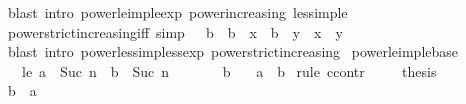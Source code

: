 \begin{isabellebody}
\ {\isacharparenleft}{\kern0pt}blast\ intro{\isacharcolon}{\kern0pt}\ power{\isacharunderscore}{\kern0pt}le{\isacharunderscore}{\kern0pt}imp{\isacharunderscore}{\kern0pt}le{\isacharunderscore}{\kern0pt}exp\ power{\isacharunderscore}{\kern0pt}increasing\ less{\isacharunderscore}{\kern0pt}imp{\isacharunderscore}{\kern0pt}le{\isacharparenright}{\kern0pt}%
\endisatagproof
{\isafoldproof}%
%
\isadelimproof
\isanewline
%
\endisadelimproof
\isanewline
{}\isamarkupfalse%
\ power{\isacharunderscore}{\kern0pt}strict{\isacharunderscore}{\kern0pt}increasing{\isacharunderscore}{\kern0pt}iff\ {\isacharbrackleft}{\kern0pt}simp{\isacharbrackright}{\kern0pt}{\isacharcolon}{\kern0pt}\ {\isachardoublequoteopen}{}\ {\isacharless}{\kern0pt}\ b\ {\isasymLongrightarrow}\ b\ {\isacharcircum}{\kern0pt}\ x\ {\isacharless}{\kern0pt}\ b\ {\isacharcircum}{\kern0pt}\ y\ {\isasymlongleftrightarrow}\ x\ {\isacharless}{\kern0pt}\ y{\isachardoublequoteclose}\isanewline
%
\isadelimproof
\ \ %
\endisadelimproof
%
\isatagproof
{}\isamarkupfalse%
\ {\isacharparenleft}{\kern0pt}blast\ intro{\isacharcolon}{\kern0pt}\ power{\isacharunderscore}{\kern0pt}less{\isacharunderscore}{\kern0pt}imp{\isacharunderscore}{\kern0pt}less{\isacharunderscore}{\kern0pt}exp\ power{\isacharunderscore}{\kern0pt}strict{\isacharunderscore}{\kern0pt}increasing{\isacharparenright}{\kern0pt}%
\endisatagproof
{\isafoldproof}%
%
\isadelimproof
\isanewline
%
\endisadelimproof
\isanewline
{}\isamarkupfalse%
\ power{\isacharunderscore}{\kern0pt}le{\isacharunderscore}{\kern0pt}imp{\isacharunderscore}{\kern0pt}le{\isacharunderscore}{\kern0pt}base{\isacharcolon}{\kern0pt}\isanewline
\ \ \ le{\isacharcolon}{\kern0pt}\ {\isachardoublequoteopen}a\ {\isacharcircum}{\kern0pt}\ Suc\ n\ {\isasymle}\ b\ {\isacharcircum}{\kern0pt}\ Suc\ n{\isachardoublequoteclose}\isanewline
\ \ \ \ \ {\isachardoublequoteopen}{}\ {\isasymle}\ b{\isachardoublequoteclose}\isanewline
\ \ \ {\isachardoublequoteopen}a\ {\isasymle}\ b{\isachardoublequoteclose}\isanewline
%
\isadelimproof
%
\endisadelimproof
%
\isatagproof
{}\isamarkupfalse%
\ {\isacharparenleft}{\kern0pt}rule\ ccontr{\isacharparenright}{\kern0pt}\isanewline
\ \ \isamarkupfalse%
\ {\isachardoublequoteopen}{\isasymnot}\ {\isacharquery}{\kern0pt}thesis{\isachardoublequoteclose}\isanewline
\ \ \isamarkupfalse%
\ \isamarkupfalse%
\ {\isachardoublequoteopen}b\ {\isacharless}{\kern0pt}\ a{\isachardoublequoteclose}\ \isamarkupfalse%

\end{isabellebody}
